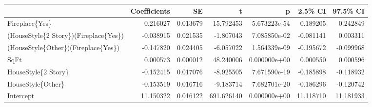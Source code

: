 \begin{tabular}{lrrrrrr}
\toprule
{} &  Coefficients &        SE &           t &             p &    2.5\% CI &   97.5\% CI \\
\midrule
Fireplace\{Yes\}                        &      0.216027 &  0.013679 &   15.792453 &  5.673223e-54 &   0.189205 &   0.242849 \\
(HouseStyle\{2 Story\})(Fireplace\{Yes\}) &     -0.038915 &  0.021535 &   -1.807043 &  7.085850e-02 &  -0.081141 &   0.003311 \\
(HouseStyle\{Other\})(Fireplace\{Yes\})   &     -0.147820 &  0.024405 &   -6.057022 &  1.564339e-09 &  -0.195672 &  -0.099968 \\
SqFt                                  &      0.000573 &  0.000012 &   48.240006 &  0.000000e+00 &   0.000550 &   0.000596 \\
HouseStyle\{2 Story\}                   &     -0.152415 &  0.017076 &   -8.925505 &  7.671590e-19 &  -0.185898 &  -0.118932 \\
HouseStyle\{Other\}                     &     -0.153519 &  0.016716 &   -9.183714 &  7.682701e-20 &  -0.186296 &  -0.120742 \\
Intercept                             &     11.150322 &  0.016122 &  691.626140 &  0.000000e+00 &  11.118710 &  11.181933 \\
\bottomrule
\end{tabular}
